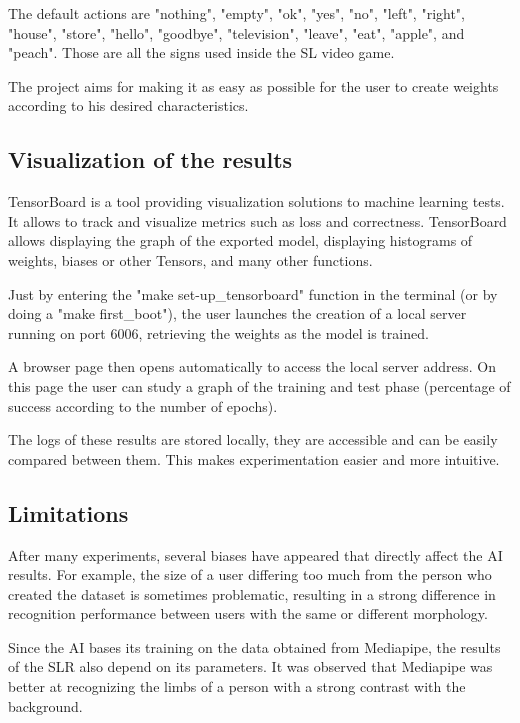 The default actions are "nothing", "empty", "ok", "yes", "no", "left", "right", "house", "store", "hello", "goodbye", "television", "leave", "eat", "apple", and "peach". Those are all the signs used inside the SL video game.

The project aims for making it as easy as possible for the user to create weights according to his desired characteristics.

\subsection{Visualization of the results}

TensorBoard is a tool providing visualization solutions to machine learning tests. It allows to track and visualize metrics such as loss and correctness. TensorBoard allows displaying the graph of the exported model, displaying histograms of weights, biases or other Tensors, and many other functions.

Just by entering the "make set-up\_tensorboard" function in the terminal (or by doing a "make first\_boot"), the user launches the creation of a local server running on port 6006, retrieving the weights as the model is trained. 

A browser page then opens automatically to access the local server address. On this page the user can study a graph of the training and test phase (percentage of success according to the number of epochs). 

The logs of these results are stored locally, they are accessible and can be easily compared between them. This makes experimentation easier and more intuitive.

\subsection{Limitations}

After many experiments, several biases have appeared that directly affect the AI results. For example, the size of a user differing too much from the person who created the dataset is sometimes problematic, resulting in a strong difference in recognition performance between users with the same or different morphology. 

Since the AI bases its training on the data obtained from Mediapipe, the results of the SLR also depend on its parameters. It was observed that Mediapipe was better at recognizing the limbs of a person with a strong contrast with the background. 


